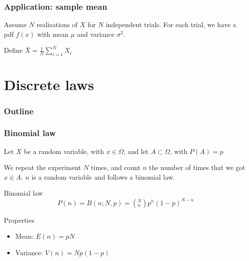 \documentclass[9pt]{beamer}
\newif\ifmynote
\newcommand\mynote[1]{%
\ifmynote \textbf{#1} \else \fi
}
\begin{document}
\begin{frame}
 \frametitle{Application: sample mean}
 
 \mynote{Écrire au tableau}
 
  Assume $N$ realisations of $X$ for $N$ independent trials. For each trial, we have a pdf $f(x)$ with mean $\mu$ and variance $\sigma^2$. 
  
  Define $\bar{X} = \frac{1}{N} \sum_{i=1}^{N} X_i$
  

\end{frame}

\section{Discrete laws}

\begin{frame}
 \frametitle{Outline}
 
 \tableofcontents[current]
\end{frame}

\begin{frame}
 \frametitle{Binomial law}
 
 \mynote{Écrire au tableau}
 
 Let $X$ be a random variable, with $x \in \Omega$, and let $A \subset \Omega$, with $P(A) = p$
 
 We repeat the experiment $N$ times, and count $n$ the number of times that we got $x \in A$. $n$ is a random variable and follows a binomial law.
 
 \begin{block}{Binomial law}
  $$P(n) = B(n;N,p) = \left( ^N_n \right) p^n (1-p)^{N-n}$$
 \end{block}
 
 \begin{block}{Properties}
  \begin{itemize}
   \item Mean: $E(n) = pN$
   \item Variance: $V(n) = N p (1-p)$
  \end{itemize}
 \end{block}

\end{frame}
\end{document}
